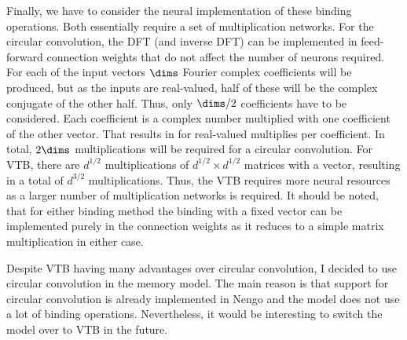 Finally, we have to consider the neural implementation of these binding operations.
Both essentially require a set of multiplication networks.
For the circular convolution, the DFT (and inverse DFT) can be implemented in feed-forward connection weights that do not affect the number of neurons required.
For each of the input vectors $\dims$ Fourier complex coefficients will be produced, but as the inputs are real-valued, half of these will be the complex conjugate of the other half.
Thus, only $\dims / 2$ coefficients have to be considered.
Each coefficient is a complex number multiplied with one coefficient of the other vector.
That results in for real-valued multiplies per coefficient.
In total, $2\dims$ multiplications will be required for a circular convolution.
For VTB, there are $d^{1/2}$ multiplications of $d^{1/2} \times d^{1/2}$ matrices with a vector, resulting in a total of $d^{3/2}$ multiplications.
Thus, the VTB requires more neural resources as a larger number of multiplication networks is required.
It should be noted, that for either binding method the binding with a fixed vector can be implemented purely in the connection weights as it reduces to a simple matrix multiplication in either case.

Despite VTB having many advantages over circular convolution, I decided to use circular convolution in the memory model.
The main reason is that support for circular convolution is already implemented in Nengo and the model does not use a lot of binding operations.
Nevertheless, it would be interesting to switch the model over to VTB in the future.



